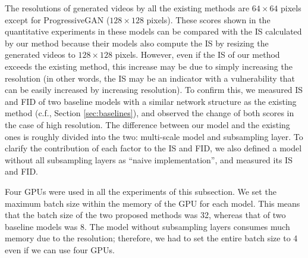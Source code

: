 \documentclass[twocolumn]{svjour3}
\def\Sec#1{Section \ref{sec:#1}}
\begin{document}
The resolutions of generated videos by all the existing methods are $64 \times 64$ pixels
except for ProgressiveGAN ($128 \times 128$ pixels).
These scores shown in the quantitative experiments in these models can be compared with
the IS calculated by our method because their models also compute the IS
by resizing the generated videos to $128 \times 128$ pixels.
However, even if the IS of our method exceeds the existing method,
this increase may be due to simply increasing the resolution
(in other words, the IS may be an indicator with a vulnerability that can be easily increased by increasing resolution).
To confirm this, we measured IS and FID of two baseline models
with a similar network structure as the existing method (c.f., \Sec{baselines}),
and observed the change of both scores in the case of high resolution.
The difference between our model and the existing ones is roughly divided into the two:
multi-scale model and subsampling layer.
To clarify the contribution of each factor to the IS and FID,
we also defined a model without all subsampling layers as
``naive implementation'', and measured its IS and FID.






Four GPUs were used in all the experiments of this subsection.
We set the maximum batch size within the memory of the GPU for each model.
This means that the batch size of the two proposed methods was 32,
whereas that of two baseline models was 8.
The model without subsampling layers consumes much memory due to the resolution;
therefore, we had to set the entire batch size to 4 even if we can use four GPUs.
\end{document}
